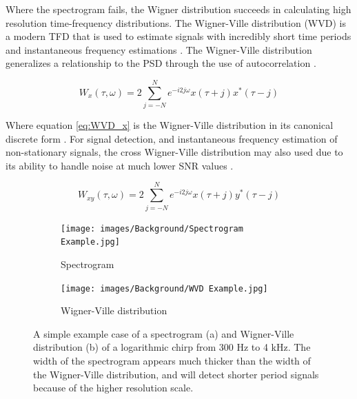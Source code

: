            Where the spectrogram fails, the Wigner distribution succeeds in calculating high resolution time-frequency distributions. The Wigner-Ville distribution (WVD) is a modern TFD that is used to estimate signals with incredibly short time periods and instantaneous frequency estimations \cite{boashash_use_1993}. The Wigner-Ville distribution generalizes a relationship to the PSD through the use of autocorrelation \cite{varanis_comparison_2020} \cite{claasen_wigner_1980}. 

            \begin{equation} \label{eq:WVD_x}
                W_{x}(\tau, \omega) = 2\sum_{j=-N}^{N} e^{-i2j\omega}x(\tau +j) x^*(\tau - j)
            \end{equation}

            Where equation \ref*{eq:WVD_x} is the Wigner-Ville distribution in its canonical discrete form \cite{kumar_wigner-ville_2022} \cite{haykin_wigner-ville_1994}. For signal detection, and instantaneous frequency estimation of non-stationary signals, the cross Wigner-Ville distribution may also used due to its ability to handle noise at much lower SNR values \cite{guanghua_wigner-ville_2006}. 

            \begin{equation} \label{eq:XWVD}
                 W_{xy}(\tau, \omega) = 2\sum_{j=-N}^{N} e^{-i2j\omega}x(\tau +j) y^*(\tau - j)
            \end{equation}

            \begin{figure} [t]
                \centering
                \begin{subfigure}[c]{0.45\textwidth}
                    \centering
                    \texttt{[image: images/Background/Spectrogram Example.jpg]}
                    \caption{Spectrogram}
                    \label{fig: spectrogram 1}
                \end{subfigure}
                \hfill
                \begin{subfigure}[c]{0.45\textwidth}
                    \centering
                    \texttt{[image: images/Background/WVD Example.jpg]}
                    \caption{Wigner-Ville distribution}
                    \label{fig: WVD 1}
                \end{subfigure}
                \hfill
                \caption{A simple example case of a spectrogram (a) and Wigner-Ville distribution (b) of a logarithmic chirp from 300 Hz to 4 kHz. The width of the spectrogram appears much thicker than the width of the Wigner-Ville distribution, and will detect shorter period signals because of the higher resolution scale.}
                \label{fig:wvd and spectrogram}
            \end{figure}
        
